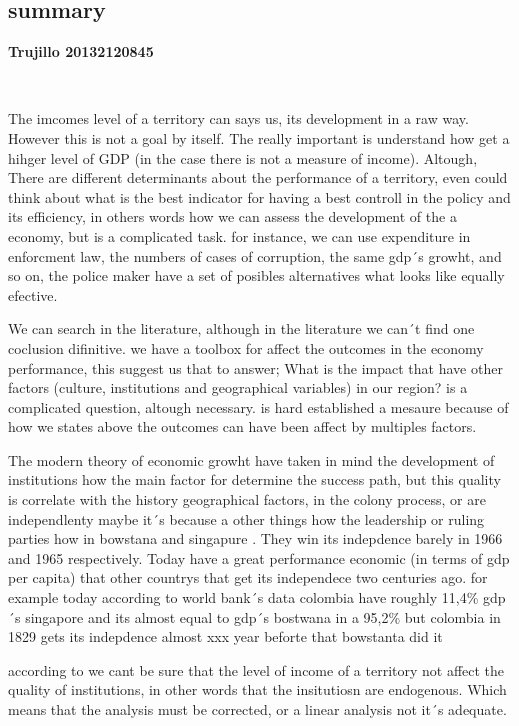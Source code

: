 \documentclass[12pt,letterpaper]{report}
\author{Iván Andrés Trujillo}
\begin{document}
\subsection*{summary }{\textbf{Trujillo 20132120845}}

\
\

The imcome\´s level of a territory can says us, its development in a raw way. However this is not a goal by itself. The really important is understand how get a hihger level of GDP (in the case there is not a measure of income). Altough, There are different determinants about the performance of a territory, even could think about what is the best indicator for having a best controll in the policy and its efficiency, in others words how we can assess the development of the a economy, but is a complicated task. for instance, we can use expenditure in enforcment law, the numbers of cases of corruption, the same gdp´s growht, and so on, the police maker have a set of posibles alternatives what looks like equally efective.



We can search in the literature, although in the literature we can´t find one coclusion difinitive. we have a  toolbox for affect the outcomes in the economy performance, this suggest us that to answer; What is the impact that have other factors (culture, institutions and geographical variables) in our region? is a complicated question, altough necessary. is hard established a mesaure because of how we states above the outcomes can have been affect by multiples factors. 


The modern theory of economic growht have taken in mind the development of institutions how the main factor for determine the success path, but this quality is correlate with the history geographical factors, in the colony process, or are independlenty maybe it´s because a other things how the leadership or ruling parties how in bowstana and singapure \cite{rodriguez}. They win its indepdence barely in 1966 and 1965 respectively. Today have a great performance  economic (in terms of gdp per capita) that other countrys that get its independece two  centuries ago. for example today according to world bank´s data colombia have roughly 11,4\% gdp´s singapore and its almost equal to gdp´s bostwana in a 95,2\% but colombia  in 1829 gets its indepdence almost xxx year beforte that bowstanta did it

according to \cite{institutions} we cant be sure that the level of income of a territory not affect the quality of institutions, in other words that the insitutiosn are endogenous. Which means that the analysis must be corrected, or a linear analysis not it´s adequate.
\end{document}
